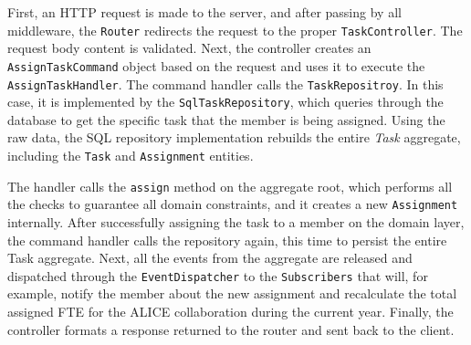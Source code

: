 First, an HTTP request is made to the server, and after passing by all middleware, the \texttt{Router} redirects the request to the proper \texttt{TaskController}. The request body content is validated. Next, the controller creates an \texttt{AssignTaskCommand} object based on the request and uses it to execute the \texttt{AssignTaskHandler}. The command handler calls the \texttt{TaskRepositroy}. In this case, it is implemented by the \texttt{SqlTaskRepository}, which queries through the database to get the specific task that the member is being assigned. Using the raw data, the SQL repository implementation rebuilds the entire \textit{Task} aggregate, including the \texttt{Task} and \texttt{Assignment} entities.

The handler calls the \texttt{assign} method on the aggregate root, which performs all the checks to guarantee all domain constraints, and it creates a new \texttt{Assignment} internally. After successfully assigning the task to a member on the domain layer, the command handler calls the repository again, this time to persist the entire Task aggregate. Next, all the events from the aggregate are released and dispatched through the \texttt{EventDispatcher} to the \texttt{Subscribers} that will, for example, notify the member about the new assignment and recalculate the total assigned FTE for the ALICE collaboration during the current year. Finally, the controller formats a response returned to the router and sent back to the client.
